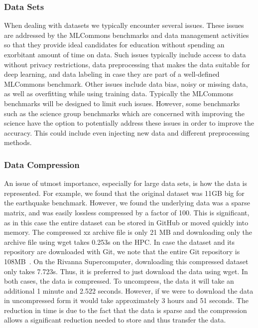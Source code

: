 \subsubsection{Data Sets}

When dealing with datasets we typically encounter several issues.  These issues are addressed by the MLCommons benchmarks and data management activities so that they provide ideal candidates for education without spending an exorbitant amount of time on data. Such issues typically include access to data without privacy restrictions, data preprocessing that makes the data suitable for deep learning, and data labeling in case they are part of a well-defined MLCommons benchmark. Other issues include data bias, noisy or missing data, as well as overfitting while using training data. Typically the MLCommons benchmarks will be designed to limit such issues. However, some benchmarks such as the science group benchmarks which are concerned with improving the science have the option to potentially address these issues in order to improve the accuracy. This could include even injecting new data and different preprocessing methods.


\subsubsection{Data Compression}

An issue of utmost importance, especially for large data sets, is how the data is represented. For example, we found that the original dataset was 11GB big for the earthquake benchmark. However, we found the underlying data was a sparse matrix, and was easily lossless compressed by a factor of 100. This is significant, as in this case the entire dataset can be stored in GitHub or moved quickly into memory. The compressed xz archive file is only 21 MB and downloading only the archive file using wget takes 0.253s on the HPC. In case the dataset and its repository are downloaded with Git, we note that the entire Git repository is 108MB~\citep{eq-data}. On the Rivanna Supercomputer, downloading this compressed dataset only takes 7.723s. Thus, it is preferred to just download the data using wget. In both cases, the data is compressed. To uncompress, the data it will take an additional 1 minute and 2.522 seconds. However, if we were to download the data in uncompressed form it would take approximately 3 hours and 51 seconds. The reduction in time is due to the fact that the data is sparse and the compression allows a significant reduction needed to store and thus transfer the data.


